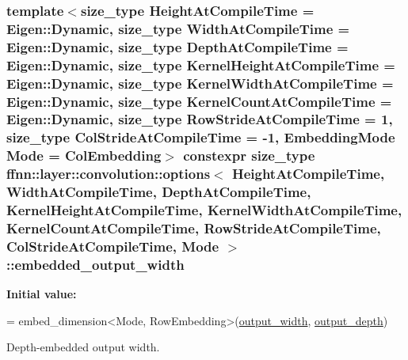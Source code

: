 \hypertarget{structffnn_1_1layer_1_1convolution_1_1options_a50aa15bb4c8e8b85748ad8485850e2ba}{
\subsubsection[{embedded\-\_\-output\-\_\-width}]{\setlength{\rightskip}{0pt plus 5cm}template$<$size\-\_\-type Height\-At\-Compile\-Time = Eigen\-::\-Dynamic, size\-\_\-type Width\-At\-Compile\-Time = Eigen\-::\-Dynamic, size\-\_\-type Depth\-At\-Compile\-Time = Eigen\-::\-Dynamic, size\-\_\-type Kernel\-Height\-At\-Compile\-Time = Eigen\-::\-Dynamic, size\-\_\-type Kernel\-Width\-At\-Compile\-Time = Eigen\-::\-Dynamic, size\-\_\-type Kernel\-Count\-At\-Compile\-Time = Eigen\-::\-Dynamic, size\-\_\-type Row\-Stride\-At\-Compile\-Time = 1, size\-\_\-type Col\-Stride\-At\-Compile\-Time = -\/1, Embedding\-Mode Mode = Col\-Embedding$>$ constexpr {\bf size\-\_\-type} {\bf ffnn\-::layer\-::convolution\-::options}$<$ Height\-At\-Compile\-Time, Width\-At\-Compile\-Time, Depth\-At\-Compile\-Time, Kernel\-Height\-At\-Compile\-Time, Kernel\-Width\-At\-Compile\-Time, Kernel\-Count\-At\-Compile\-Time, Row\-Stride\-At\-Compile\-Time, Col\-Stride\-At\-Compile\-Time, Mode $>$\-::embedded\-\_\-output\-\_\-width\hspace{0.3cm}{\ttfamily [static]}}}\label{structffnn_1_1layer_1_1convolution_1_1options_a50aa15bb4c8e8b85748ad8485850e2ba}
{\bfseries Initial value\-:}
\begin{DoxyCode}
=
    embed\_dimension<Mode, RowEmbedding>(\hyperlink{structffnn_1_1layer_1_1convolution_1_1options_a3d54e3e43cc0e955c4a64bcf6b5800d7}{output\_width},  \hyperlink{structffnn_1_1layer_1_1convolution_1_1options_a7efc40f0f1fccd6267ac93acd9c3fe05}{output\_depth})
\end{DoxyCode}


Depth-\/embedded output width. 

